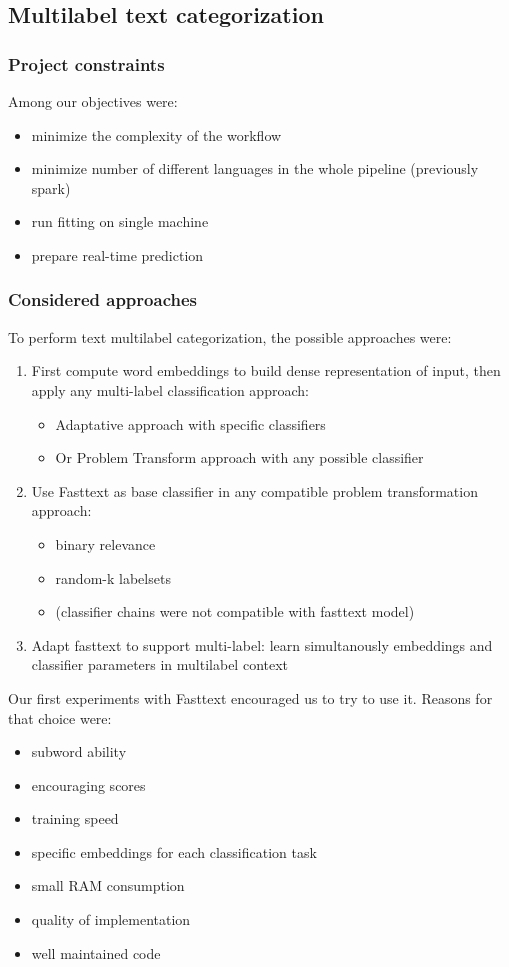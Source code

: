 \subsection{Multilabel text categorization}

\subsubsection{Project constraints}

Among our objectives were:
\begin{itemize}
	\item minimize the complexity of the workflow
	\item minimize number of different languages in the whole pipeline (previously spark)
	\item run fitting on single machine
	\item prepare real-time prediction
\end{itemize}


\subsubsection{Considered approaches}
To perform text multilabel categorization, the possible approaches were:
\begin{enumerate}
	\item First compute word embeddings to build dense representation of input, then apply any multi-label classification approach:
	\begin{itemize}
		\item Adaptative approach with specific classifiers
		\item Or Problem Transform approach with any possible classifier
	\end{itemize}
	\item Use Fasttext as base classifier in any compatible problem transformation approach:
	\begin{itemize}
		\item binary relevance
		\item random-k labelsets
		\item (classifier chains were not compatible with fasttext model)
	\end{itemize}
	\item Adapt fasttext to support multi-label: learn simultanously embeddings and classifier parameters in multilabel context
\end{enumerate}


Our first experiments with Fasttext encouraged us to try to use it. Reasons for that choice were:
\begin{itemize}
	\item subword ability
	\item encouraging scores
	\item training speed
	\item specific embeddings for each classification task
	\item small RAM consumption
	\item quality of implementation
	\item well maintained code
\end{itemize}

